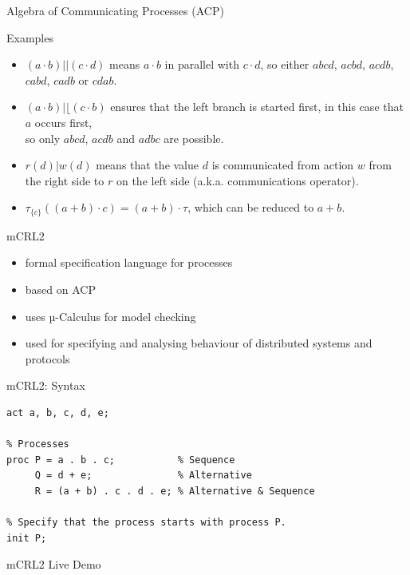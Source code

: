 \documentclass[aspectratio=1610]{beamer}
\begin{document}
  \begin{frame}{Algebra of Communicating Processes (ACP)}
    \begin{exampleblock}{Examples}
      \begin{itemize}
        \item $(a \cdot b) || (c \cdot d)$ means $a \cdot b$ in parallel with $c \cdot d$, so either $abcd$, $acbd$, $acdb$, $cabd$, $cadb$ or $cdab$.
        \item $(a \cdot b) |\lfloor (c \cdot b)$ ensures that the left branch is started first, in this case that $a$ occurs first, \\ so only $abcd$, $acdb$ and $adbc$ are possible.
        \item $r(d) | w(d)$ means that the value $d$ is communicated from action $w$ from the right side to $r$ on the left side (a.k.a. communications operator).
        \item $\tau_{\{c\}}((a+b)\cdot c) = (a + b) \cdot \tau$, which can be reduced to $a + b$.
      \end{itemize}
    \end{exampleblock}
  \end{frame}

  \begin{frame}{mCRL2}
    \begin{itemize}
      \item formal specification language for processes
      \item based on ACP
      \item uses µ-Calculus for model checking
      \item used for specifying and analysing behaviour of distributed systems and protocols
    \end{itemize}
  \end{frame}

  \begin{frame}[fragile]{mCRL2: Syntax}
    \begin{lstlisting}[language=mCRL2]
% Actions
act a, b, c, d, e;

% Processes
proc P = a . b . c;           % Sequence
     Q = d + e;               % Alternative
     R = (a + b) . c . d . e; % Alternative & Sequence

% Specify that the process starts with process P.
init P;
    \end{lstlisting}
  \end{frame}

  \begin{frame}[standout]
    mCRL2 Live Demo
  \end{frame}
\end{document}
